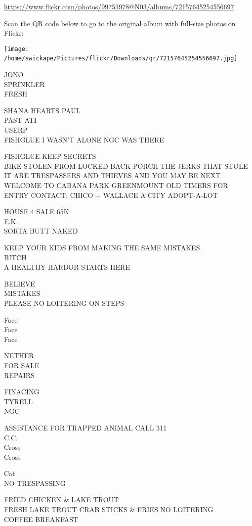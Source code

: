 \documentclass[10pt,letterpaper]{article}
\begin{document}
\url{https://www.flickr.com/photos/99753978@N03/albums/72157645254556697}

Scan the QR code below to go to the original album with full-size photos on Flickr:

\texttt{[image: /home/swickape/Pictures/flickr/Downloads/qr/72157645254556697.jpg]}
\

JONO\\
SPRINKLER\\
FRESH

SHANA HEARTS PAUL\\
PAST ATI\\
USERP\\
FISHGLUE I WASN'T ALONE NGC WAS THERE

FISHGLUE KEEP SECRETS\\
BIKE STOLEN FROM LOCKED BACK PORCH THE JERKS THAT STOLE IT ARE TRESPASSERS AND THIEVES AND YOU MAY BE NEXT\\
WELCOME TO CABANA PARK GREENMOUNT OLD TIMERS FOR ENTRY CONTACT: CHICO + WALLACE A CITY ADOPT{-}A{-}LOT

HOUSE 4 SALE 65K\\
E.K.\\
SORTA BUTT NAKED

KEEP YOUR KIDS FROM MAKING THE SAME MISTAKES\\
BITCH\\
A HEALTHY HARBOR STARTS HERE

BELIEVE\\
MISTAKES\\
PLEASE NO LOITERING ON STEPS

Face\\
Face\\
Face

NETHER\\
FOR SALE\\
REPAIRS

FINACING\\
TYRELL\\
NGC

ASSISTANCE FOR TRAPPED ANIMAL CALL 311\\
C.C.\\
Cross\\
Cross

Cat\\
NO TRESPASSING

FRIED CHICKEN \& LAKE TROUT\\
FRESH LAKE TROUT CRAB STICKS \& FRIES NO LOITERING\\
COFFEE BREAKFAST
\end{document}
